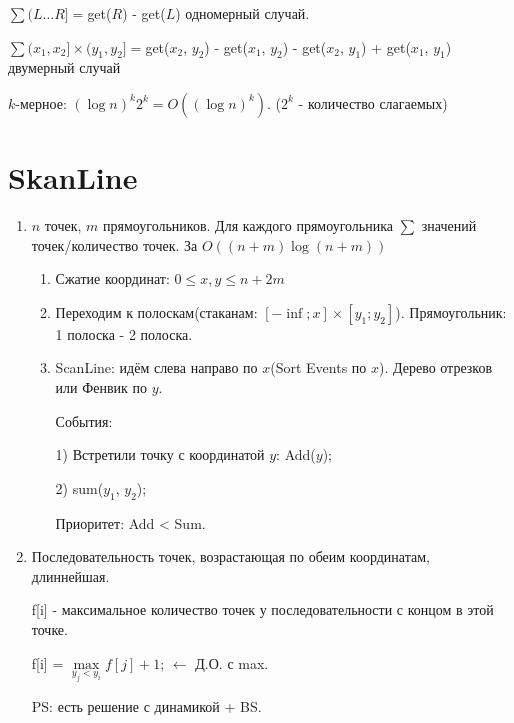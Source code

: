 $\sum(L \dots R] = $get($R$) - get($L$) одномерный случай.

$\sum(x_1, x_2]\times(y_1, y_2] = $get($x_2$, $y_2$) - get($x_1$, $y_2$) - get($x_2$, $y_1$) + get($x_1$, $y_1$) двумерный случай

$k$-мерное: $(\log n)^k2^k = O((\log n)^k)$. ($2^k$ - количество слагаемых)

\section{SkanLine}

\begin{enumerate}
	\item $n$ точек, $m$ прямоугольников. Для каждого прямоугольника  $\sum$ значений точек/количество точек. За $O((n + m)\log(n + m))$
	\begin{enumerate}
		\item Сжатие координат: $0 \le x, y \le n + 2m$
		\item Переходим к полоскам(стаканам: $[-\inf; x]\times[y_1; y_2]$). Прямоугольник: 1 полоска - 2 полоска.
		\item ScanLine: идём слева направо по $x$(Sort Events по $x$). Дерево отрезков или Фенвик по $y$.

		События:

		1) Встретили точку с координатой $y$: Add($y$);

		2) sum($y_1$, $y_2$);

		Приоритет: Add < Sum.
	\end{enumerate}
	\item Последовательность точек, возрастающая по обеим координатам, длиннейшая.

	f[i] - максимальное количество точек у последовательности с концом в этой точке.

	f[i] = $\max\limits_{y_j < y_i} f[j] + 1$; $\leftarrow$ Д.О. с max.

	PS: есть решение с динамикой + BS.
\end{enumerate}
